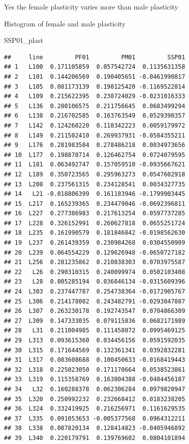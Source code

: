 \documentclass[
]{article}
\newenvironment{Shaded}{\begin{snugshade}}{\end{snugshade}}
\newcommand{\NormalTok}[1]{#1}
\begin{document}
Yes the female plasticity varies more than male plasticity

Histogram of female and male plasticity

\begin{Shaded}
\begin{Highlighting}[]
\NormalTok{SSP01_plast}
\end{Highlighting}
\end{Shaded}

\begin{verbatim}
##     line         PF01         PM01         SSP01
## 1   L100  0.171105859  0.057542724  0.1135631358
## 2   L101  0.144206569  0.190405651 -0.0461990817
## 3   L105  0.081173139  0.198125420 -0.1169522814
## 4   L109  0.215622395  0.238724029 -0.0231016333
## 5   L136  0.280106575  0.211756645  0.0683499294
## 6   L138  0.216702585  0.163763549  0.0529390357
## 7   L142  0.124260220  0.118342223  0.0059179972
## 8   L149  0.211502410  0.269937931 -0.0584355211
## 9   L176  0.281983584  0.278486218  0.0034973656
## 10  L177  0.198870714  0.126462754  0.0724079595
## 11  L181  0.063492747  0.157059510 -0.0935667621
## 12  L189  0.350723565  0.295963273  0.0547602918
## 13  L208  0.237561315  0.234128541  0.0034327735
## 14   L21 -0.018806399  0.161183946 -0.1799903445
## 15  L217  0.165239365  0.234479046 -0.0692396811
## 16  L227  0.277386983  0.217613254  0.0597737285
## 17  L228  0.326152991  0.260627818  0.0655251724
## 18  L235  0.161990579  0.181846842 -0.0198562630
## 19  L237  0.261439359  0.230984268  0.0304550909
## 20  L239  0.064554229  0.129626948 -0.0650727182
## 21  L256  0.281235862  0.210838303  0.0703975587
## 22   L26  0.290310315  0.240099974  0.0502103408
## 23   L28  0.005285194  0.036846134 -0.0315609396
## 24  L303  0.237447787  0.254738364 -0.0172905767
## 25  L306  0.214178002  0.243482791 -0.0293047887
## 26  L307  0.263230178  0.192743547  0.0704866309
## 27  L309  0.147333035  0.079115836  0.0682171989
## 28   L31  0.211004985  0.111458072  0.0995469125
## 29  L313  0.093615360  0.034456156  0.0591592035
## 30  L315  0.171644569  0.132361341  0.0392832281
## 31  L317  0.083608688  0.100450633 -0.0168419443
## 32  L318  0.225023050  0.171170664  0.0538523861
## 33  L319  0.115358769  0.163804388 -0.0484456187
## 34   L32  0.160288378  0.062306284  0.0979820947
## 35  L320  0.250992232  0.232668412  0.0183238205
## 36  L324  0.332419925  0.216256971  0.1161629535
## 37  L335  0.091053653 -0.005377568  0.0964312211
## 38  L338  0.087820134  0.128414823 -0.0405946892
## 39  L340  0.220179791  0.139769602  0.0804101894

\end{verbatim}
\end{document}
